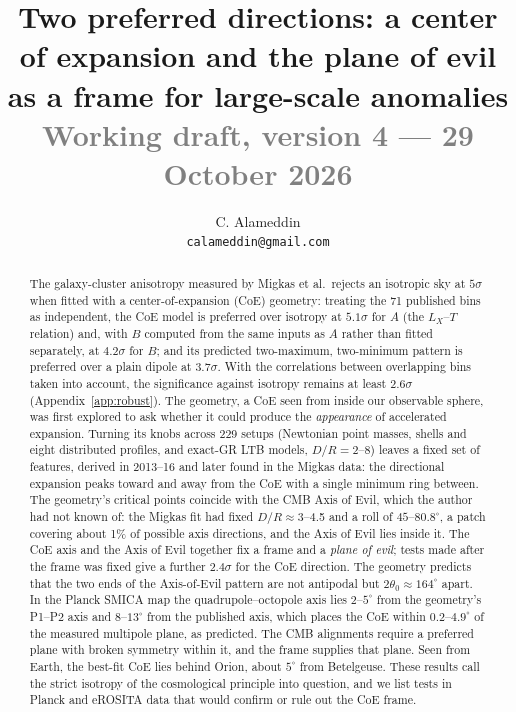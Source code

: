 \documentclass[11pt,a4paper]{article}
\title{\textbf{Two preferred directions: a center of expansion and the plane of evil as a frame for large-scale anomalies}\\[4pt]
\large\textcolor{gray}{Working draft, version 4 --- 29 October 2026}}
\author{C. Alameddin\\ \small\texttt{calameddin@gmail.com}}
\date{}
\newcommand{\dg}{^\circ}
\begin{document}
\maketitle
\thispagestyle{fancy}

\begin{abstract}
The galaxy-cluster anisotropy measured by Migkas et al.\ rejects an isotropic sky at $5\sigma$ when fitted with a center-of-expansion (CoE) geometry: treating the 71 published bins as independent, the CoE model is preferred over isotropy at $5.1\sigma$ for $A$ (the $L_X$--$T$ relation) and, with $B$ computed from the same inputs as $A$ rather than fitted separately, at $4.2\sigma$ for $B$; and its predicted two-maximum, two-minimum pattern is preferred over a plain dipole at $3.7\sigma$. With the correlations between overlapping bins taken into account, the significance against isotropy remains at least $2.6\sigma$ (Appendix~\ref{app:robust}). The geometry, a CoE seen from inside our observable sphere, was first explored to ask whether it could produce the \emph{appearance} of accelerated expansion. Turning its knobs across 229 setups (Newtonian point masses, shells and eight distributed profiles, and exact-GR LTB models, $D/R=2$--8) leaves a fixed set of features, derived in 2013--16 and later found in the Migkas data: the directional expansion peaks toward and away from the CoE with a single minimum ring between. The geometry's critical points coincide with the CMB Axis of Evil, which the author had not known of: the Migkas fit had fixed $D/R\approx3$--4.5 and a roll of $45$--$80.8\dg$, a patch covering about 1\% of possible axis directions, and the Axis of Evil lies inside it. The CoE axis and the Axis of Evil together fix a frame and a \emph{plane of evil}; tests made after the frame was fixed give a further $2.4\sigma$ for the CoE direction. The geometry predicts that the two ends of the Axis-of-Evil pattern are not antipodal but $2\theta_0\approx164\dg$ apart. In the Planck SMICA map the quadrupole--octopole axis lies $2$--$5\dg$ from the geometry's P1--P2 axis and $8$--$13\dg$ from the published axis, which places the CoE within $0.2$--$4.9\dg$ of the measured multipole plane, as predicted. The CMB alignments require a preferred plane with broken symmetry within it, and the frame supplies that plane. Seen from Earth, the best-fit CoE lies behind Orion, about $5\dg$ from Betelgeuse. These results call the strict isotropy of the cosmological principle into question, and we list tests in Planck and eROSITA data that would confirm or rule out the CoE frame.
\end{abstract}
\end{document}
